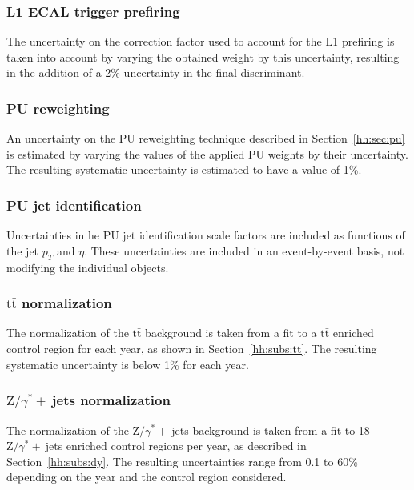 \documentclass[../main.tex]{subfiles}
\begin{document}
\subsubsection*{L1 ECAL trigger prefiring}

The uncertainty on the correction factor used to account for the L1 prefiring is taken into account by varying the obtained weight by this uncertainty, resulting in the addition of a 2\% uncertainty in the final discriminant.

\subsubsection*{PU reweighting}

An uncertainty on the PU reweighting technique described in Section~\ref{hh:sec:pu} is estimated by varying the values of the applied PU weights by their uncertainty. The resulting systematic uncertainty is estimated to have a value of 1\%.

\subsubsection{PU jet identification}

Uncertainties in he PU jet identification scale factors are included as functions of the jet $p_T$ and $\eta$. These uncertainties are included in an event-by-event basis, not modifying the individual objects.

\subsubsection*{$\text{t}\bar{\text{t}}$ normalization}

The normalization of the $\text{t}\bar{\text{t}}$ background is taken from a fit to a $\text{t}\bar{\text{t}}$ enriched control region for each year, as shown in Section~\ref{hh:subs:tt}. The resulting systematic uncertainty is below 1\% for each year.

\subsubsection*{$\text{Z}/\gamma^*+~$jets normalization}

The normalization of the $\text{Z}/\gamma^*+~$jets background is taken from a fit to 18 $\text{Z}/\gamma^*+~$jets enriched control regions per year, as described in Section~\ref{hh:subs:dy}. The resulting uncertainties range from 0.1 to 60\% depending on the year and the control region considered.
\end{document}

